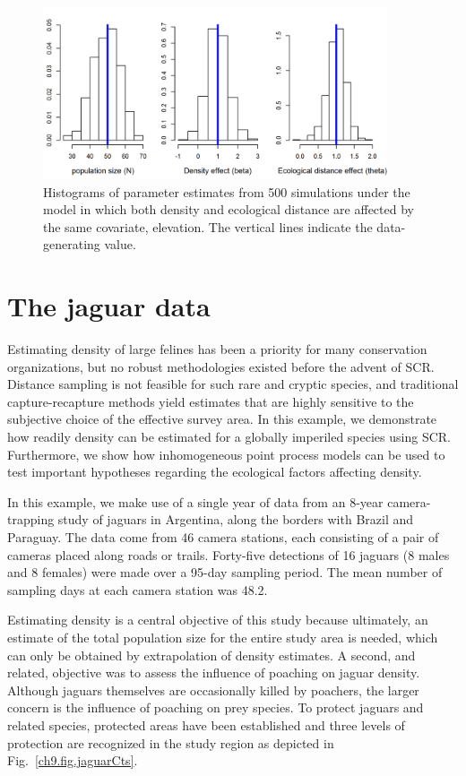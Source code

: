 \begin{figure}
\centering
\includegraphics[width=4in,height=2in]{Ch11/figs/scrDEDsim}
\caption{Histograms of parameter estimates from 500 simulations under
  the model in which both density and ecological distance are affected
by the same covariate, elevation. The vertical lines indicate the
data-generating value.}
\label{ch9.fig.sim}
\end{figure}



\section{The jaguar data}

Estimating density of large felines has been a priority for many
conservation organizations, but no robust methodologies existed before
the advent of SCR. Distance sampling is not feasible for such rare and
cryptic species, and traditional capture-recapture methods yield
estimates that are highly sensitive to the subjective choice of the
effective survey area. In this example, we
demonstrate how readily density can be estimated for a
globally imperiled species using SCR. Furthermore, we show how
inhomogeneous point process models can be used to test important
hypotheses regarding the ecological factors affecting density.

In this example, we make use of a single year of data from an 8-year
camera-trapping study of jaguars in Argentina,
along the borders with Brazil and Paraguay. The data come from 46
camera stations, each consisting of a pair of cameras placed along
roads or trails. Forty-five detections of 16 jaguars (8 males and 8
females) were made over a 95-day sampling period. The mean number of
sampling days at each camera station was 48.2.

Estimating density is a central objective of this study because
ultimately, an estimate of the total population size for the entire
study area is needed, which can only be obtained by extrapolation of
density estimates. A second, and related, objective was to assess
the influence of poaching on jaguar density. Although jaguars
themselves are occasionally killed by poachers, the larger concern is
the influence of poaching on prey species. To protect jaguars and
related species, protected areas have
been established and three levels of protection are
recognized in the study region as depicted in Fig.~\ref{ch9.fig.jaguarCts}.

